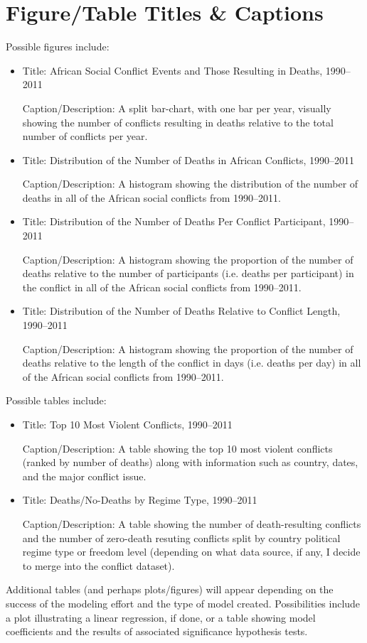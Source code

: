 \documentclass{article}
\begin{document}
\section{Figure/Table Titles \& Captions}
Possible figures include:
\begin{itemize}
\item Title: African Social Conflict Events and Those Resulting in Deaths, 1990--2011

Caption/Description: A split bar-chart, with one bar per year, visually showing the number of conflicts resulting in deaths relative to the total number of conflicts per year.
\item Title: Distribution of the Number of Deaths in African Conflicts, 1990--2011

Caption/Description: A histogram showing the distribution of the number of deaths in all of the African social conflicts from 1990--2011.
\item Title: Distribution of the Number of Deaths Per Conflict Participant, 1990--2011

Caption/Description: A histogram showing the proportion of the number of deaths relative to the number of participants (i.e. deaths per participant) in the conflict in all of the African social conflicts from 1990--2011.

\item Title: Distribution of the Number of Deaths Relative to Conflict Length, 1990--2011

Caption/Description: A histogram showing the proportion of the number of deaths relative to the length of the conflict in days (i.e. deaths per day) in all of the African social conflicts from 1990--2011.
\end{itemize}
Possible tables include:
\begin{itemize}
\item Title: Top 10 Most Violent Conflicts, 1990--2011

Caption/Description: A table showing the top 10 most violent conflicts (ranked by number of deaths) along with information such as country, dates, and the major conflict issue.

\item Title: Deaths/No-Deaths by Regime Type, 1990--2011

Caption/Description: A table showing the number of death-resulting conflicts and the number of zero-death resuting conflicts split by country political regime type or freedom level (depending on what data source, if any, I decide to merge into the conflict dataset).
\end{itemize}
Additional tables (and perhaps plots/figures) will appear depending on the success of the modeling effort and the type of model created.  Possibilities include a plot illustrating a linear regression, if done, or a table showing model coefficients and the results of associated significance hypothesis tests.
\end{document}
